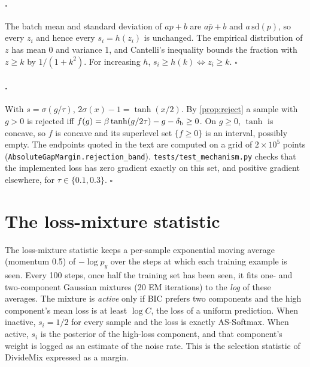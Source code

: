 \paragraph{.}
The batch mean and standard deviation of $a p + b$ are $a\bar p + b$ and $a\,\mathrm{sd}(p)$, so
every $z_i$ and hence every $s_i = h(z_i)$ is unchanged. The empirical distribution of $z$ has mean
0 and variance 1, and Cantelli's inequality bounds the fraction with $z \ge k$ by $1/(1+k^2)$.
For increasing $h$, $s_i \ge h(k) \iff z_i \ge k$. \hfill$\square$

\paragraph{.}
With $s = \sigma(g/\tau)$, $2\sigma(x) - 1 = \tanh(x/2)$. By \cref{prop:reject} a sample with
$g > 0$ is rejected iff $f(g) = \beta\tanh(g/2\tau) - g - \delta_{\mathrm{b}} \ge 0$. On $g \ge 0$, $\tanh$ is
concave, so $f$ is concave and its superlevel set $\{f \ge 0\}$ is an interval, possibly empty. The
endpoints quoted in the text are computed on a grid of $2\times10^5$ points
(\texttt{AbsoluteGapMargin.rejection\_band}). \texttt{tests/test\_mechanism.py} checks that the
implemented loss has zero gradient exactly on this set, and positive gradient elsewhere, for
$\tau \in \{0.1, 0.3\}$. \hfill$\square$

\section{The loss-mixture statistic}
\label{app:mixture}

The loss-mixture statistic keeps a per-sample exponential moving average (momentum 0.5) of
$-\log p_y$ over the steps at which each training example is seen. Every 100 steps, once half the
training set has been seen, it fits one- and two-component Gaussian mixtures (20 EM iterations) to
the \emph{log} of these averages. The mixture is \emph{active} only if BIC prefers two components
and the high component's mean loss is at least $\log C$, the loss of a uniform prediction. When
inactive, $s_i = 1/2$ for every sample and the loss is exactly AS-Softmax. When active, $s_i$ is
the posterior of the high-loss component, and that component's weight is logged as an estimate of
the noise rate. This is the selection statistic of DivideMix \citep{li2020dividemix} expressed as a
margin.

